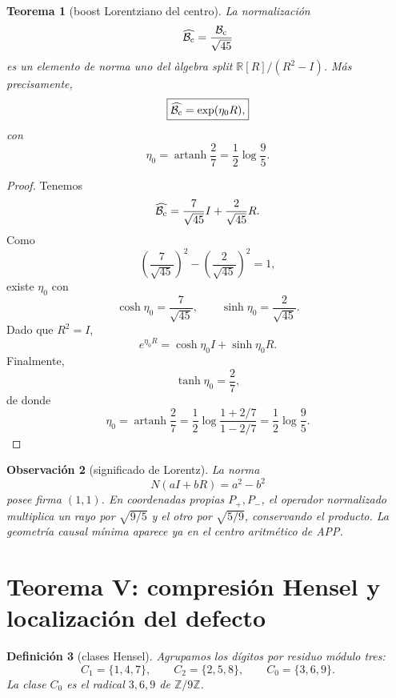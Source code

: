 \documentclass[11pt,a4paper]{article}
\newtheorem{teorema}{Teorema}
\newtheorem{definicion}[teorema]{Definici\'on}
\newtheorem{observacion}[teorema]{Observaci\'on}
\newcommand{\Bc}{\mathcal B_{\rm c}}
\newcommand{\R}{\mathbb R}
\newcommand{\Z}{\mathbb Z}
\begin{document}
\begin{teorema}[boost Lorentziano del centro]
La normalizaci\'on
\[
\widehat{\Bc}=\frac{\Bc}{\sqrt{45}}
\]
es un elemento de norma uno del \`algebra split \(\R[R]/(R^2-I)\). M\'as precisamente,
\[
\boxed{\widehat{\Bc}=\exp(\eta_0R),}
\]
con
\[
\boxed{\eta_0=\operatorname{artanh}\frac27=\frac12\log\frac95.}
\]
\end{teorema}

\begin{proof}
Tenemos
\[
\widehat{\Bc}=\frac7{\sqrt{45}}I+\frac2{\sqrt{45}}R.
\]
Como
\[
\left(\frac7{\sqrt{45}}\right)^2-\left(\frac2{\sqrt{45}}\right)^2=1,
\]
existe \(\eta_0\) con
\[
\cosh\eta_0=\frac7{\sqrt{45}},\qquad
\sinh\eta_0=\frac2{\sqrt{45}}.
\]
Dado que \(R^2=I\),
\[
e^{\eta_0R}=\cosh\eta_0 I+\sinh\eta_0 R.
\]
Finalmente,
\[
\tanh\eta_0=\frac{2}{7},
\]
de donde
\[
\eta_0=\operatorname{artanh}\frac27=\frac12\log\frac{1+2/7}{1-2/7}=\frac12\log\frac95.
\]
\end{proof}

\begin{observacion}[significado de Lorentz]
La norma
\[
N(aI+bR)=a^2-b^2
\]
posee firma \((1,1)\). En coordenadas propias \(P_+,P_-\), el operador normalizado multiplica un rayo por \(\sqrt{9/5}\) y el otro por \(\sqrt{5/9}\), conservando el producto. La geometr\'ia causal m\'inima aparece ya en el centro aritm\'etico de APP.
\end{observacion}

\section{Teorema V: compresi\'on Hensel y localizaci\'on del defecto}

\begin{definicion}[clases Hensel]
Agrupamos los d\'igitos por residuo m\'odulo tres:
\[
C_1=\{1,4,7\},\qquad C_2=\{2,5,8\},\qquad C_0=\{3,6,9\}.
\]
La clase \(C_0\) es el radical \(3,6,9\) de \(\Z/9\Z\).
\end{definicion}
\end{document}
